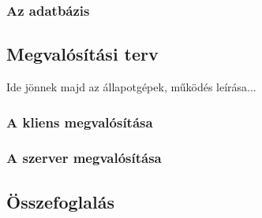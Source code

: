 \subsubsection{Az adatbázis}
\label{sec:adatb}

\subsection{Megvalósítási terv}
\label{sec:megvalositas}

Ide jönnek majd az állapotgépek, működés leírása...

\subsubsection{A kliens megvalósítása}

\subsubsection{A szerver megvalósítása}
\label{sec:szervermegvalositas}


\subsection{Összefoglalás}

